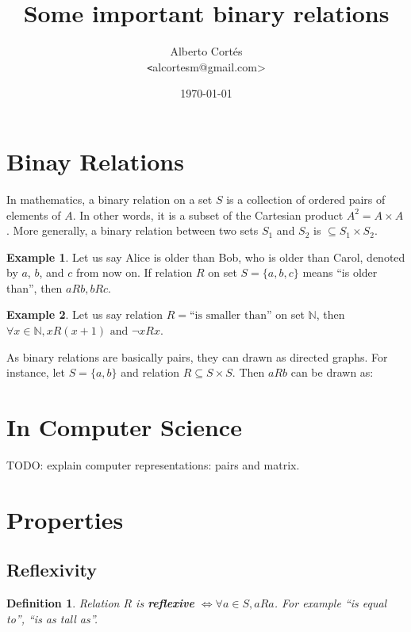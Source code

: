 \documentclass[11pt]{article}
\title{Some important binary relations}
\author{Alberto Cortés \\ {\texttt <alcortesm@gmail.com>}}
\date{\today}
\theoremstyle{plain}
\newtheorem{defn}{Definition}
\theoremstyle{definition}
\newtheorem*{example}{Example}
\begin{document}
\maketitle

\section{Binay Relations}

In mathematics, a binary relation on a set $S$ is a collection of ordered pairs of elements of $A$.
In other words, it is a subset of the Cartesian product $A^2 = A \times A$.
More generally, a binary relation between two sets $S_1$ and $S_2$ is $\subseteq S_1 \times S_2$.

\begin{example}
  Let us say Alice is older than Bob, who is older than Carol,
  denoted by $a$, $b$, and $c$ from now on.
  If relation $R$ on set $S = \{a, b, c\}$ means ``is older than'', then $aRb, bRc$.
\end{example}

\begin{example}
  Let us say relation $R = \text{``is smaller than''}$ on set $\mathbb{N}$,
  then $\forall x \in \mathbb{N}, xR(x+1) \text{ and } \neg xRx$.
\end{example}

As binary relations are basically pairs, they can drawn as directed graphs.
For instance, let $S = \{a, b\}$ and relation $R \subseteq S \times S$. Then $aRb$ can be drawn as:
\begin{center}
  
\end{center}


\section{In Computer Science}

TODO: explain computer representations: pairs and matrix.


\section{Properties}

\subsection{Reflexivity}

\begin{defn}
  Relation $R$ is \textbf{reflexive} $\iff \forall a \in S, aRa$.
  For example ``is equal to'', ``is as tall as''.
\end{defn}
\end{document}
